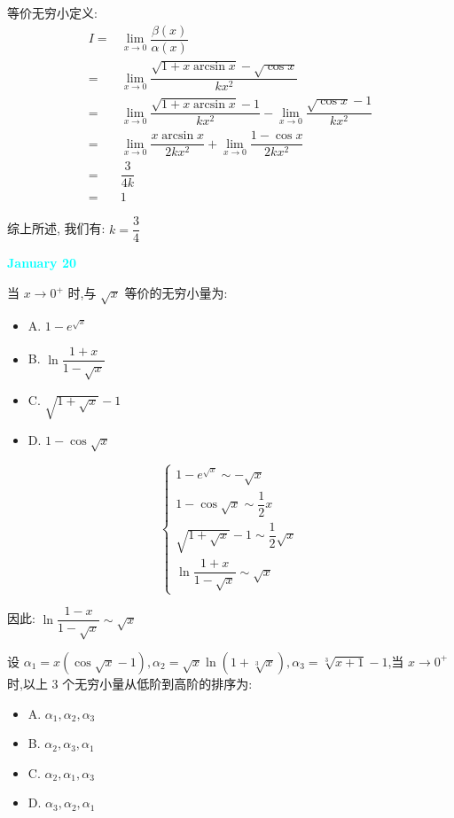 \begin{solution}

	等价无穷小定义:
	\begin{align*}
		I = & \lim\limits_{x\to 0}\dfrac{\beta(x)}{\alpha(x)}\\
		  = & \lim\limits_{x\to 0}\dfrac{\sqrt{1+x\arcsin x}-\sqrt{\cos x}}{kx^{2}}\\
		  = & \lim\limits_{x\to 0}\dfrac{\sqrt{1+x\arcsin x}-1}{kx^{2}}-\lim\limits_{x\to 0}\dfrac{\sqrt{\cos x}-1}{kx^{2}}\\
		  = & \lim\limits_{x\to 0}\dfrac{x\arcsin x}{2kx^{2}}+\lim\limits_{x\to 0}\dfrac{1-\cos x}{2kx^{2}}\\
		  = & \dfrac{3}{4k}\\
		  = & 1
	\end{align*}

	综上所述, 我们有: $k = \dfrac{3}{4}$
\end{solution}

\textcolor{cyan}{\textbf{January 20}}

\begin{example}[][Exam: 27.3.11]
	当 $x\to 0^{+}$ 时,与 $\sqrt{x}$ 等价的无穷小量为:
\begin{itemize}
	\item A. $1-e^{\sqrt{x}}$
	\item B. $\ln\dfrac{1+x}{1-\sqrt{x}}$
	\item C. $\sqrt{1+\sqrt{x}}-1$
	\item D. $1-\cos \sqrt{x}$
\end{itemize}
\end{example}

\begin{solution}

	$$\begin{cases} 
		1-e^{\sqrt{x}}\sim -\sqrt{x}\\
		1-\cos\sqrt{x} \sim \dfrac{1}{2}x\\
		\sqrt{1+\sqrt{x}}-1 \sim \dfrac{1}{2}\sqrt{x}\\
		\ln\dfrac{1+x}{1-\sqrt{x}}\sim \sqrt{x}
	\end{cases}$$

	因此: $\ln \dfrac{1-x}{1-\sqrt{x}}\sim \sqrt{x}$
\end{solution}

\begin{example}[][Exam: 27.3.12]
	设 $\alpha_{1}=x(\cos\sqrt{x}-1),\alpha_{2}=\sqrt{x}\ln(1+\sqrt[3]{x}),\alpha_{3}=\sqrt[3]{x+1}-1$,当 $x\to 0^{+}$时,以上 $3$ 个无穷小量从低阶到高阶的排序为:
\begin{itemize}
	\item A. $\alpha_{1},\alpha_{2},\alpha_{3}$
	\item B. $\alpha_{2},\alpha_{3},\alpha_{1}$
	\item C. $\alpha_{2},\alpha_{1},\alpha_{3}$
	\item D. $\alpha_{3},\alpha_{2},\alpha_{1}$
\end{itemize}
\end{example}

